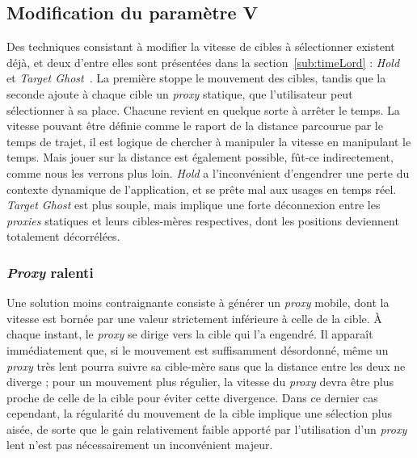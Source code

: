 	\subsection{Modification du paramètre V}
	Des techniques consistant à modifier la vitesse de cibles à sélectionner existent déjà, et deux d'entre elles sont présentées dans la section~\ref{sub:timeLord} : \emph{Hold}~\cite{hajri2011moving} et \emph{Target Ghost}~\cite{hasan2011comet}. La première stoppe le mouvement des cibles, tandis que la seconde ajoute à chaque cible un \emph{proxy} statique, que l'utilisateur peut sélectionner à sa place. Chacune revient en quelque sorte à arrêter le temps. La vitesse pouvant être définie comme le raport de la distance parcourue par le temps de trajet, il est logique de chercher à manipuler la vitesse en manipulant le temps. Mais jouer sur la distance est également possible, fût-ce indirectement, comme nous les verrons plus loin. \emph{Hold} a l'inconvénient d'engendrer une perte du contexte dynamique de l'application, et se prête mal aux usages en temps réel. \emph{Target Ghost} est plus souple, mais implique une forte déconnexion entre les \emph{proxies} statiques et leurs cibles-mères respectives, dont les positions deviennent totalement décorrélées.
	
	\subsubsection{\emph{Proxy} ralenti}
	Une solution moins contraignante consiste à générer un \emph{proxy} mobile, dont la vitesse est bornée par une valeur strictement inférieure à celle de la cible. À chaque instant, le \emph{proxy} se dirige vers la cible qui l'a engendré. Il apparaît immédiatement que, si le mouvement est suffisamment désordonné, même un \emph{proxy} très lent pourra suivre sa cible-mère sans que la distance entre les deux ne diverge ; pour un mouvement plus régulier, la vitesse du \emph{proxy} devra être plus proche de celle de la cible pour éviter cette divergence. Dans ce dernier cas cependant, la régularité du mouvement de la cible implique une sélection plus aisée, de sorte que le gain relativement faible apporté par l'utilisation d'un \emph{proxy} lent n'est pas nécessairement un inconvénient majeur.
	
